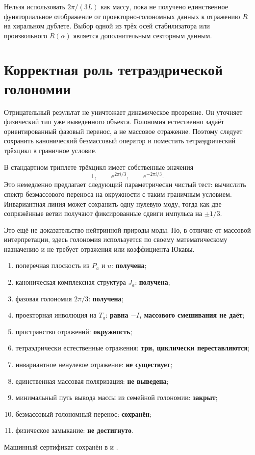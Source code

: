 \begin{nogocriterion}
Нельзя использовать $2\pi/(3L)$ как массу, пока не получено единственное
функториальное отображение от проекторно-голономных данных к отражению
$R$ на хиральном дублете. Выбор одной из трёх осей стабилизатора или
произвольного $R(\alpha)$ является дополнительным секторным данным.
\end{nogocriterion}

\section{Корректная роль тетраэдрической голономии}

Отрицательный результат не уничтожает динамическое прозрение. Он уточняет
физический тип уже выведенного объекта. Голономия естественно задаёт
ориентированный фазовый перенос, а не массовое отражение. Поэтому следует
сохранить канонический безмассовый оператор и поместить тетраэдрический
трёхцикл в граничное условие.

В стандартном триплете трёхцикл имеет собственные значения
\begin{equation}
 1,\qquad e^{2\pi i/3},\qquad e^{-2\pi i/3}.
\end{equation}
Это немедленно предлагает следующий параметрически чистый тест: вычислить
спектр безмассового переноса на окружности с таким граничным условием.
Инвариантная линия может сохранить одну нулевую моду, тогда как две
сопряжённые ветви получают фиксированные сдвиги импульса на $\pm1/3$.

Это ещё не доказательство нейтринной природы моды. Но, в отличие от
массовой интерпретации, здесь голономия используется по своему
математическому назначению и не требует отражения или коэффициента Юкавы.

\begin{protocol}
\begin{enumerate}
 \item поперечная плоскость из $P_a$ и $u$:
 \textbf{получена};
 \item каноническая комплексная структура $J_a$:
 \textbf{получена};
 \item фазовая голономия $2\pi/3$:
 \textbf{получена};
 \item проекторная инволюция на $T_a$:
 \textbf{равна $-I$, массового смешивания не даёт};
 \item пространство отражений:
 \textbf{окружность};
 \item тетраэдрически естественные отражения:
 \textbf{три, циклически переставляются};
 \item инвариантное ненулевое отражение:
 \textbf{не существует};
 \item единственная массовая поляризация:
 \textbf{не выведена};
 \item минимальный путь вывода массы из семейной голономии:
 \textbf{закрыт};
 \item безмассовый голономный перенос:
 \textbf{сохранён};
 \item физическое замыкание:
 \textbf{не достигнуто}.
\end{enumerate}
\end{protocol}

Машинный сертификат сохранён в
 и
.